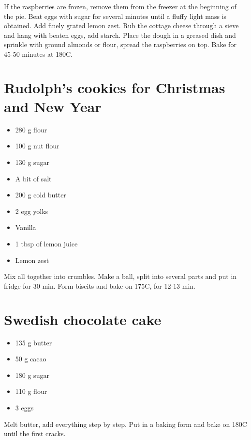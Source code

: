 \documentclass[
]{book}
\providecommand{\tightlist}{%
  \setlength{\itemsep}{0pt}\setlength{\parskip}{0pt}}
\begin{document}
If the raspberries are frozen, remove them from the freezer at the beginning of the pie.
Beat eggs with sugar for several minutes until a fluffy light mass is obtained.
Add finely grated lemon zest.
Rub the cottage cheese through a sieve and hang with beaten eggs, add starch.
Place the dough in a greased dish and sprinkle with ground almonds or flour, spread the raspberries on top. Bake for 45-50 minutes at 180C.

\hypertarget{rudolphs-cookies-for-christmas-and-new-year}{%
\section{Rudolph's cookies for Christmas and New Year}\label{rudolphs-cookies-for-christmas-and-new-year}}

\begin{itemize}
\tightlist
\item
  280 g flour
\item
  100 g nut flour
\item
  130 g sugar
\item
  A bit of salt
\item
  200 g cold butter
\item
  2 egg yolks
\item
  Vanilla
\item
  1 tbsp of lemon juice
\item
  Lemon zest
\end{itemize}

Mix all together into crumbles. Make a ball, split into several parts and put in fridge for 30 min.
Form biscits and bake on 175C, for 12-13 min.

\hypertarget{swedish-chocolate-cake}{%
\section{Swedish chocolate cake}\label{swedish-chocolate-cake}}

\begin{itemize}
\tightlist
\item
  135 g butter
\item
  50 g cacao
\item
  180 g sugar
\item
  110 g flour
\item
  3 eggs
\end{itemize}

Melt butter, add everything step by step.
Put in a baking form and bake on 180C until the first cracks.
\end{document}
